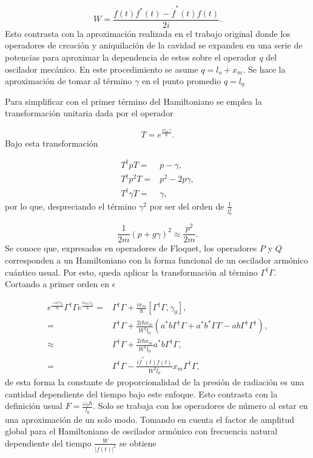 \documentclass[10pt,a4paper]{report}
\begin{document}
\begin{equation}
W= \frac{\dot{f}(t)f^*(t)-\dot{f}^*(t)f(t)}{2i}.
\end{equation}
Esto contrasta con la aproximación realizada en el trabajo original
donde los operadores de creación y aniquilación de la cavidad se
expanden en una serie de potencias para aproximar la dependencia de
estos sobre el operador $q$ del oscilador mecánico. En este
procedimiento se asume $q = l_o + x_m$.  Se hace la aproximación de tomar al término $\gamma$ en el punto promedio  $q=l_0$


Para simplificar con el primer término del Hamiltoniano se emplea la transformación unitaria dada por el operador

\begin{equation}
T = e^\frac{i x_m \gamma}{\hbar}.
\end{equation} Bajo esta transformación 

\begin{align*}
T^\dagger p T =& p - \gamma, \\
T^\dagger p^2 T =& p^2 -2p\gamma, \\
T^\dagger \gamma T =& \gamma,
\end{align*} por lo que, despreciando el término $\gamma^2$ por ser del orden de $\frac{1}{l_0^2}$

\begin{equation}
\frac{1}{2m}(p + g \gamma)^2 \approx \frac{p^2}{2m}.
\end{equation} Se conoce que, expresados en operadores de Floquet, los operadores $P$ y $Q$ corresponden a un Hamiltoniano con la forma funcional de un oscilador armónico cuántico usual. Por esto, queda aplicar la transformación al término $\Gamma^\dagger \Gamma$. Cortando a primer orden en $\epsilon$

\begin{align*}
e^{\frac{-ix\gamma_0}{\hbar}}\Gamma^\dagger \Gamma e^{\frac{ix_m\gamma_0}{\hbar}} =& \Gamma^\dagger \Gamma + \frac{ix_m}{\hbar}[\Gamma^\dagger \Gamma, \gamma_0], \\
=& \Gamma^\dagger \Gamma + \frac{2i\hbar x_m}{W^2 l_0}(a^*b \Gamma^\dagger \Gamma + a^*b^* \Gamma \Gamma -ab\Gamma^\dagger \Gamma^\dagger),\\
\approx & \Gamma^\dagger \Gamma + \frac{2i\hbar x_m}{W^2 l_0} a^*b \Gamma^\dagger \Gamma, \\
=& \Gamma^\dagger \Gamma - \frac{i \dot{f}^*(t)f(t) }{W^2 l_0} x_m  \Gamma^\dagger \Gamma,
\end{align*} de esta forma la constante de proporcionalidad de la presión de radiación es una cantidad dependiente del tiempo bajo este enfoque. Esto contrasta con la definición usual $F= \frac{\omega_0 \hbar}{l_0}$. Solo se trabaja con los operadores de número al estar en una aproximación de un solo modo. Tomando en cuenta el factor de amplitud global para el Hamiltoniano de oscilador armónico con frecuencia natural dependiente del tiempo $\frac{W}{|f(t)|^2}$ se obtiene
\end{document}
